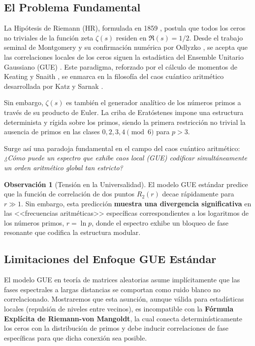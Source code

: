\documentclass[12pt, a4paper]{article}
\theoremstyle{plain}
\theoremstyle{definition}
\newtheorem{observacion}[teorema]{Observación}
\theoremstyle{remark}
\begin{document}
\subsection{El Problema Fundamental}
\label{subsec:problema_fundamental}

La Hipótesis de Riemann (HR), formulada en 1859 \cite{riemann1859}, postula que todos los ceros no triviales de la función zeta $\zeta(s)$ residen en $\Re(s)=1/2$. Desde el trabajo seminal de Montgomery \cite{montgomery1973} y su confirmación numérica por Odlyzko \cite{odlyzko2001}, se acepta que las correlaciones locales de los ceros siguen la estadística del Ensemble Unitario Gaussiano (GUE) \cite{montgomery1973, odlyzko2001, berry1999}. Este paradigma, reforzado por el cálculo de momentos de Keating y Snaith \cite{keatingsnaith2000}, se enmarca en la filosofía del caos cuántico aritmético desarrollada por Katz y Sarnak \cite{katzsarnak1999, sarnak1999}.

Sin embargo, $\zeta(s)$ es también el generador analítico de los números primos a través de su producto de Euler. La criba de Eratóstenes impone una estructura determinista y rígida sobre los primos, siendo la primera restricción no trivial la ausencia de primos en las clases $0,2,3,4 \pmod{6}$ para $p>3$.

Surge así una paradoja fundamental en el campo del caos cuántico aritmético: \textit{¿Cómo puede un espectro que exhibe caos local (GUE) codificar simultáneamente un orden aritmético global tan estricto?}

\medskip

\begin{observacion}[Tensi\'on en la Universalidad]
El modelo GUE estándar predice que la función de correlación de dos puntos 
$R_2(r)$ decae rápidamente para $r \gg 1$. Sin embargo, esta predicción 
\textbf{muestra una divergencia significativa} en las <<frecuencias aritméticas>> específicas correspondientes 
a los logaritmos de los números primos, $r = \ln p$, donde el espectro exhibe 
un bloqueo de fase resonante que codifica la estructura modular.
\end{observacion}

\subsection{Limitaciones del Enfoque GUE Estándar}
\label{subsec:limitaciones_gue}

El modelo GUE en teoría de matrices aleatorias asume implícitamente que las fases espectrales a largas distancias se comportan como ruido blanco no correlacionado. Mostraremos que esta asunción, aunque válida para estadísticas locales (repulsión de niveles entre vecinos), es incompatible con la \textbf{Fórmula Explícita de Riemann-von Mangoldt}, la cual conecta determinísticamente los ceros con la distribución de primos y debe inducir correlaciones de fase específicas para que dicha conexión sea posible.
\end{document}
